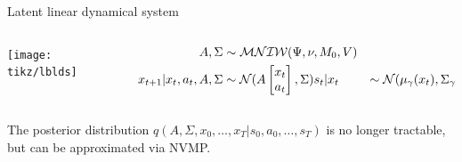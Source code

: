 \documentclass[10pt, compress]{beamer}
\begin{document}

\begin{frame}{Latent linear dynamical system}
  \begin{columns}
    \begin{column}{0.3\textwidth}
        \texttt{[image: tikz/lblds]}
    \end{column}
    \begin{column}{0.6\textwidth}
      \begin{align*}
        A, \Sigma &\sim \mathcal{MNIW}(\Psi, \nu, M_0, V) \\
        x_{t + 1} | x_t, a_t, A, \Sigma &\sim \mathcal{N}(A\begin{bmatrix}x_t\\a_t\end{bmatrix}, \Sigma)
        s_t | x_t &\sim \mathcal{N}(\mu_\gamma(x_t), \Sigma_\gamma(x_t))
      \end{align*}
    \end{column}
  \end{columns}
	The posterior distribution 
	$
	q(A, \Sigma, x_0, \ldots, x_T | {s_0, a_0, \ldots, s_T})
	$
	is no longer tractable, but can be approximated via NVMP.
\end{frame}
\end{document}

